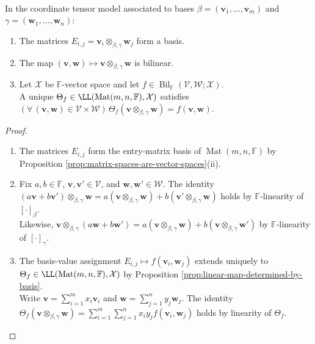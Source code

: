 \begin{proposition} \label{prop:tensor-product-matrix-basis-model} \\
In the coordinate tensor model associated to bases $\beta=(\mathbf{v}_1,\ldots,\mathbf{v}_m)$ and $\gamma=(\mathbf{w}_1,\ldots,\mathbf{w}_n)$:
\begin{enumerate}[label=(\roman*)]
\setlength{\itemsep}{0pt}
\item The matrices $E_{i,j}=\mathbf{v}_i\otimes_{\beta,\gamma}\mathbf{w}_j$ form a basis.
\item The map $(\mathbf{v},\mathbf{w})\mapsto\mathbf{v}\otimes_{\beta,\gamma}\mathbf{w}$ is bilinear.
\item Let $\mathcal{X}$ be $\mathbb{F}$-vector space and let $f\in\operatorname{Bil}_{\mathbb{F}}(\mathcal{V},\mathcal{W};\mathcal{X})$.\\
A unique $\Theta_f\in\LL(\operatorname{Mat}(m,n,\mathbb{F}),\mathcal{X})$ satisfies $(\forall\,(\mathbf{v},\mathbf{w})\in\mathcal{V}\times\mathcal{W})\,\Theta_f(\mathbf{v}\otimes_{\beta,\gamma}\mathbf{w})=f(\mathbf{v},\mathbf{w})$.
\end{enumerate}
\begin{proof}
\begin{enumerate}[label=(\roman*)]
\setlength{\itemsep}{0pt}
\item The matrices $E_{i,j}$ form the entry-matrix basis of $\operatorname{Mat}(m,n,\mathbb{F})$ by Proposition \ref{prop:matrix-spaces-are-vector-spaces}(ii).
\item Fix $a,b\in\mathbb{F}$, $\mathbf{v},\mathbf{v}'\in\mathcal{V}$, and $\mathbf{w},\mathbf{w}'\in\mathcal{W}$. The identity $(a\mathbf{v}+b\mathbf{v}')\otimes_{\beta,\gamma}\mathbf{w}=a(\mathbf{v}\otimes_{\beta,\gamma}\mathbf{w})+b(\mathbf{v}'\otimes_{\beta,\gamma}\mathbf{w})$ holds by $\mathbb{F}$-linearity of $[\cdot]_\beta$.\\
Likewise, $\mathbf{v}\otimes_{\beta,\gamma}(a\mathbf{w}+b\mathbf{w}')=a(\mathbf{v}\otimes_{\beta,\gamma}\mathbf{w})+b(\mathbf{v}\otimes_{\beta,\gamma}\mathbf{w}')$ by $\mathbb{F}$-linearity of $[\cdot]_\gamma$.
\item The basis-value assignment $E_{i,j}\mapsto f(\mathbf{v}_i,\mathbf{w}_j)$ extends uniquely to $\Theta_f\in\LL(\operatorname{Mat}(m,n,\mathbb{F}),\mathcal{X})$ by Proposition \ref{prop:linear-map-determined-by-basis}.\\
Write $\mathbf{v}=\sum\limits_{i=1}^{m}x_i\mathbf{v}_i$ and $\mathbf{w}=\sum\limits_{j=1}^{n}y_j\mathbf{w}_j$. The identity $\Theta_f(\mathbf{v}\otimes_{\beta,\gamma}\mathbf{w})=\sum\limits_{i=1}^{m}\sum\limits_{j=1}^{n}x_iy_jf(\mathbf{v}_i,\mathbf{w}_j)$ holds by linearity of $\Theta_f$.\\

\end{enumerate}
\end{proof}
\end{proposition}
